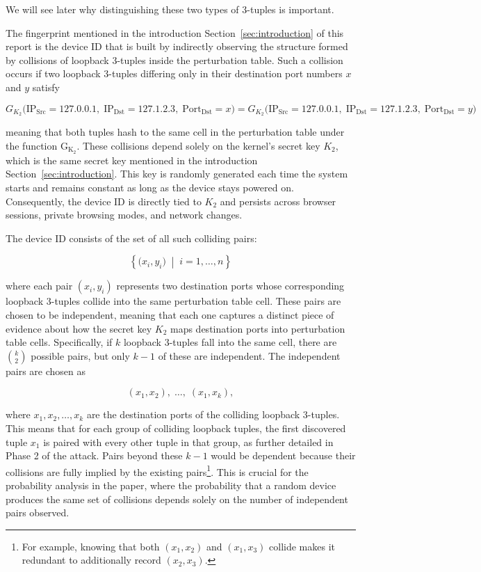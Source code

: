\documentclass{report}
\begin{document}
We will see later why distinguishing these two types of 3-tuples is important.

The fingerprint mentioned in the introduction Section~\ref{sec:introduction} of this report is the \alert{device ID} that is built by indirectly observing the structure formed by \alert{collisions of loopback 3-tuples} inside the perturbation table. Such a collision occurs if two loopback 3-tuples differing only in their destination port numbers $x$ and $y$ satisfy

\begin{equation*}
	G_{K_{2}}\bigl(\mathrm{IP}_{\mathrm{Src}} = 127.0.0.1,\; \mathrm{IP}_{\mathrm{Dst}} = 127.1.2.3,\; \mathrm{Port}_{\mathrm{Dst}} = x \bigr)
	=
	G_{K_{2}}\bigl(\mathrm{IP}_{\mathrm{Src}} = 127.0.0.1,\; \mathrm{IP}_{\mathrm{Dst}} = 127.1.2.3,\; \mathrm{Port}_{\mathrm{Dst}} = y \bigr)
\end{equation*}

meaning that both tuples hash to the same cell in the perturbation table under the function $\mathrm{G_{K_2}}$. These collisions depend solely on the kernel’s \alert{secret key} $K_2$, which is the same secret key mentioned in the introduction Section~\ref{sec:introduction}. This key is randomly generated each time the \alert{system starts} and remains constant as long as the device stays powered on. Consequently, the device ID is directly tied to $K_2$ and persists across browser sessions, private browsing modes, and network changes.

The device ID consists of the set of all such colliding pairs:

\[
	\left\{ \bigl(x_i, y_i\bigr) \;\middle|\; i = 1, \ldots, n \right\}
\]

where each pair $(x_i, y_i)$ represents \alert{two destination ports} whose corresponding loopback 3-tuples collide into the same perturbation table cell. These pairs are chosen to be \alert{independent}, meaning that each one captures a distinct piece of evidence about how the secret key $K_2$ maps destination ports into perturbation table cells. Specifically, if $k$ loopback 3-tuples fall into the same cell, there are $\binom{k}{2}$ possible pairs, but only $k-1$ of these are independent. The independent pairs are chosen as

\[
	(x_1, x_2),\; \ldots,\; (x_1, x_k),
\]

where $x_1, x_2, \ldots, x_k$ are the destination ports of the colliding loopback 3-tuples. This means that for each group of colliding loopback tuples, the first discovered tuple $x_1$ is paired with every other tuple in that group, as further detailed in Phase 2 of the attack. Pairs beyond these $k-1$ would be \alert{dependent} because their collisions are fully implied by the existing pairs\footnote{For example, knowing that both $(x_1, x_2)$ and $(x_1, x_3)$ collide makes it redundant to additionally record $(x_2, x_3)$.}. This is crucial for the probability analysis in the paper, where the probability that a random device produces the same set of collisions depends solely on the number of independent pairs observed.
\end{document}
